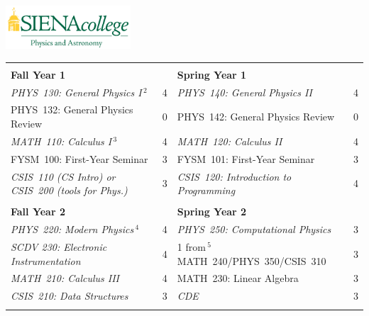 \documentclass[12pt]{article}
\begin{document}
\hfill 

\includegraphics[width=0.35\textwidth]{siena_phys_astro_print_crop.jpg}

\vspace{0.1cm}
\vspace{0.3cm}

\vspace*{-5mm}
\begin{table}[h!]
\begin{center}
{\renewcommand{\arraystretch}{1.2}
\begin{tabular*}{0.9\textwidth}{@{\extracolsep{\fill}}lclc}
 & \\
{\Large \textbf{Fall Year 1}} & & {\Large \textbf{Spring Year 1}} & \\
\hline
{\em PHYS~130: General Physics I}\,$^{2}$  & 4 & {\em PHYS~140: General Physics II}     & 4 \\
PHYS~132: General Physics Review           & 0 & PHYS~142: General Physics Review & 0\\
{\em MATH~110: Calculus I}\,$^{3}$         & 4 & {\em MATH~120: Calculus II}            & 4 \\
FYSM~100: First-Year Seminar               & 3 & FYSM~101: First-Year Seminar     & 3\\
{\em CSIS~110 (CS Intro) or CSIS~200 (tools for Phys.)}    & 3 & 
{\em CSIS~120: Introduction to Programming}  & 4 \\

 & \\
{\Large \textbf{Fall Year 2}} & & {\Large \textbf{Spring Year 2}} & \\
\hline
{\em PHYS~220: Modern Physics}\,$^{4}$      & 4 & 
{\em PHYS~250: Computational Physics}      & 3 \\
{\em SCDV 230: Electronic Instrumentation} & 4 &
1 from\,$^{5}$ MATH~240/PHYS~350/CSIS~310                & 3  \\
{\em MATH~210: Calculus III}               & 4 & MATH~230: Linear Algebra & 3 \\
{\em CSIS~210: Data Structures}    & 3 & 
{\em CDE} & 3 \\


 & \\
 

\end{tabular*}}
\end{center}
\end{table}
\end{document}
